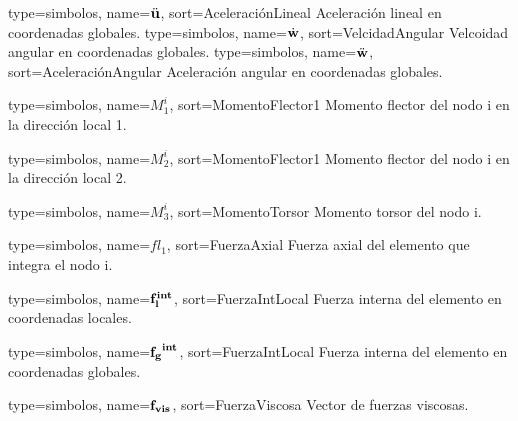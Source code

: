 {
	type={simbolos},
	name={$\ddot{\bf{u}}$}, %
	sort={AceleraciónLineal} %
}
{Aceleración lineal en coordenadas globales.}
{
	type={simbolos},
	name={$\dot{\bf{w}}$}, %
	sort={VelcidadAngular} %
}
{Velcoidad angular en coordenadas globales.}
{
	type={simbolos},
	name={$\ddot{\bf{w}}$}, %
	sort={AceleraciónAngular} %
}
{Aceleración angular en coordenadas globales.}

{
	type={simbolos},
	name={$M^i_1$}, %
	sort={MomentoFlector1} %
}
{Momento flector del nodo i en la dirección local 1.}


{
	type={simbolos},
	name={$M^i_2$}, %
	sort={MomentoFlector1} %
}
{Momento flector del nodo i en la dirección local 2.}

{
	type={simbolos},
	name={$M^i_3$}, %
	sort={MomentoTorsor} %
}
{Momento torsor del nodo i.}


{
	type={simbolos},
	name={$fl_1$}, %
	sort={FuerzaAxial} %
}
{Fuerza axial del elemento que integra el nodo i.}

{
	type={simbolos},
	name={$\bf{ f_l^{int}}$}, %
	sort={FuerzaIntLocal} %
}
{Fuerza interna del elemento en coordenadas locales.}

{
	type={simbolos},
	name={$\bf{f_g}^{int}$}, %
	sort={FuerzaIntLocal} %
}
{Fuerza interna del elemento en coordenadas globales.}

{
	type={simbolos},
	name={$\bf{f_{vis}}$}, %
	sort={FuerzaViscosa} %
}
{Vector de fuerzas viscosas.}

